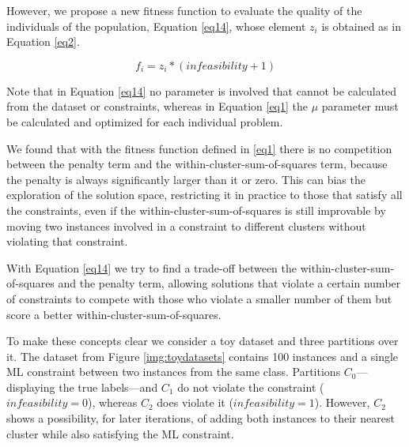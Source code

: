 \documentclass[review]{elsarticle}
\begin{document}
However, we propose a new fitness function to evaluate the quality of the individuals of the population, Equation \eqref{eq14}, whose element $z_i$ is obtained as in Equation \eqref{eq2}.

\begin{equation}
f_i = z_i * (infeasibility + 1)
\label{eq14}
\end{equation}

Note that in Equation \eqref{eq14} no parameter is involved that cannot be calculated from the dataset or constraints, whereas in Equation \eqref{eq1} the $\mu$ parameter must be calculated and optimized for each individual problem.

We found that with the fitness function defined in \eqref{eq1} there is no competition between the penalty term and the within-cluster-sum-of-squares term, because the penalty is always significantly larger than it or zero. This can bias the exploration of the solution space, restricting it in practice to those that satisfy all the constraints, even if the within-cluster-sum-of-squares is still improvable by moving two instances involved in a constraint to different clusters without violating that constraint.

With Equation \eqref{eq14} we try to find a trade-off between the within-cluster-sum-of-squares and the penalty term, allowing solutions that violate a certain number of constraints to compete with those who violate a smaller number of them but score a better within-cluster-sum-of-squares.

To make these concepts clear we consider a toy dataset and three partitions over it. The dataset from Figure \ref{img:toydatasets} contains 100 instances and a single ML constraint between two instances from the same class. Partitions $C_0$---displaying the true labels---and $C_1$ do not violate the constraint ($infeasibility = 0$), whereas $C_2$ does violate it ($infeasibility = 1$). However, $C_2$ shows a possibility, for later iterations, of adding both instances to their nearest cluster while also satisfying the ML constraint.
\end{document}
